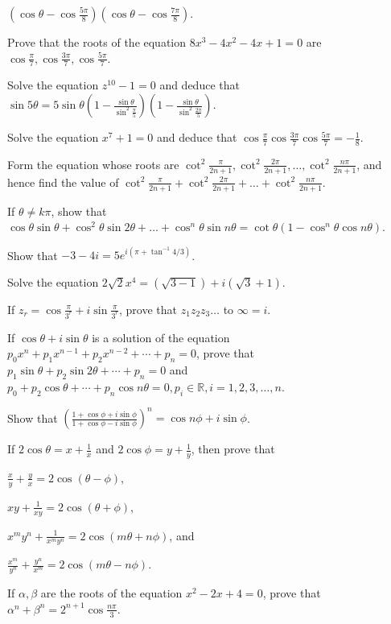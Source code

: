   $\left(\cos\theta - \cos\frac{5\pi}{8}\right)\left(\cos\theta - \cos\frac{7\pi}{8}\right)$.
\item Prove that the roots of the equation $8x^3 - 4x^2 - 4x + 1= 0$ are $\cos\frac{\pi}{7}, \cos\frac{3\pi}{7},
  \cos\frac{5\pi}{7}$.
\item Solve the equation $z^{10} - 1 = 0$ and deduce that $\sin5\theta = 5\sin\theta\left(1 -
  \frac{\sin\theta}{\sin^2\frac{\pi}{5}}\right)\left(1 - \frac{\sin\theta}{\sin^2\frac{2\pi}{5}}\right)$.
\item Solve the equation $x^7 +1 = 0$ and deduce that $\cos\frac{\pi}{7}\cos\frac{3\pi}{7}\cos\frac{5\pi}{7} = -\frac{1}{8}$.
\item Form the equation whose roots are $\cot^2\frac{\pi}{2n + 1}, \cot^2\frac{2\pi}{2n + 1}, \ldots, \cot^2\frac{n\pi}{2n + 1}$,
  and hence find the value of $\cot^2\frac{\pi}{2n + 1} + \cot^2\frac{2\pi}{2n + 1} + \ldots + \cot^2\frac{n\pi}{2n + 1}$.
\item If $\theta \neq k\pi$, show that $\cos\theta\sin\theta + \cos^2\theta\sin2\theta + \ldots + \cos^n\theta\sin n\theta =
  \cot\theta(1 - \cos^n\theta\cos n\theta)$.
\item Show that $-3 - 4i = 5e^{i(\pi + \tan^{-1}4/3)}$.
\item Solve the equation $2\sqrt{2}x^4 = (\sqrt{3 - 1}) + i(\sqrt{3} + 1)$.
\item If $z_r = \cos\frac{\pi}{3^r} + i\sin\frac{\pi}{3^r}$, prove that $z_1z_2z_3\ldots$ to $\infty = i$.
\item If $\cos\theta + i\sin\theta$ is a solution of the equation $p_0x^n + p_1x^{n - 1} + p_2x^{n - 2} +
  \cdots + p_n = 0$, prove that $p_1\sin\theta + p_2\sin2\theta + \cdots + p_n = 0$ and $p_0 + p_2\cos\theta
  + \cdots + p_n\cos n\theta = 0, p_i\in\mathbb{R}, i=1, 2, 3, \ldots, n$.
\item Show that $\left(\frac{1 + \cos\phi + i\sin\phi}{1 + \cos\phi - i\sin\phi}\right)^n = \cos n\phi + i\sin\phi$.
\item If $2\cos\theta = x + \frac{1}{x}$ and $2\cos\phi = y + \frac{1}{y}$, then prove that
  \startitemize[i]
  \item $\frac{x}{y} + \frac{y}{x} = 2\cos(\theta - \phi)$,
  \item $xy + \frac{1}{xy} = 2\cos(\theta + \phi)$,
  \item $x^my^n + \frac{1}{x^my^n} = 2\cos(m\theta + n\phi)$, and
  \item $\frac{x^m}{y^n} + \frac{y^n}{x^m} = 2\cos(m\theta - n\phi)$.
  \stopitemize
\item If $\alpha, \beta$ are the roots of the equation $x^2 - 2x + 4 = 0$, prove that $\alpha^n + \beta^n = 2^{n +
  1}\cos\frac{n\pi}{3}$.
